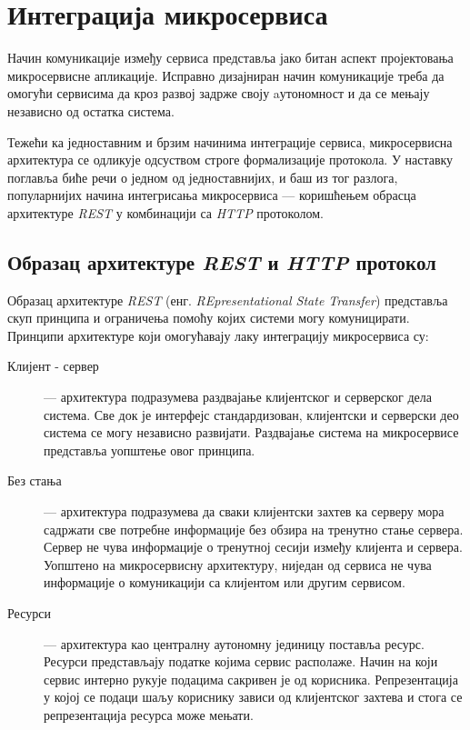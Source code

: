 \documentclass[12pt,oneside]{memoir}
\begin{document}
\newpage

\section{Интеграција микросервиса}

Начин комуникације између сервиса представља јако битан аспект пројектовања микросервисне апликације. Исправно дизајниран начин комуникације треба да омогући сервисима да кроз развој задрже своју aутономност и да се мењају независно од остатка система. 

Тежећи ка једноставним и брзим начинима интеграције сервиса, микросервисна архитектура се одликује одсуством строге формализације протокола. У наставку поглавља биће речи о једном од једноставнијих, и баш из тог разлога, популарнијих начина интегрисања микросервиса  --- коришћењем обрасца архитектуре \textit{REST}  у комбинацији са \textit{HTTP} протоколом.

\subsection{Образац архитектуре \textit{REST} и \textit{HTTP} протокол}

Образац архитектуре \textit{REST} (енг. \textit{REpresentational State Transfer}) представља скуп принципа и ограничења помоћу којих системи могу комуницирати. Принципи архитектуре који омогућавају лаку интеграцију микросервиса су:

\begin{description}
\item[Клијент - сервер]  --- архитектура подразумева раздвајање клијентског и серверског дела система. Све док је интерфејс стандардизован, клијентски и серверски део система се могу независно развијати. Раздвајање система на микросервисе представља уопштење овог принципа.
\item[Без стања] --- архитектура подразумева да сваки клијентски захтев ка серверу мора садржати све потребне информације без обзира на тренутно стање сервера. Сервер не чува информације о тренутној сесији између клијента и сервера. Уопштено на микросервисну архитектуру, ниједан од сервиса не чува информације о комуникацији са клијентом или другим сервисом.
\item[Ресурси] --- архитектура као централну аутономну јединицу поставља ресурс. Ресурси представљају податке којима сервис располаже. Начин на који сервис интерно рукује подацима сакривен је од корисника. Репрезентација у којој се подаци шаљу кориснику зависи од клијентског захтева и стога се репрезентација ресурса може мењати.
\end{description}
\end{document}
